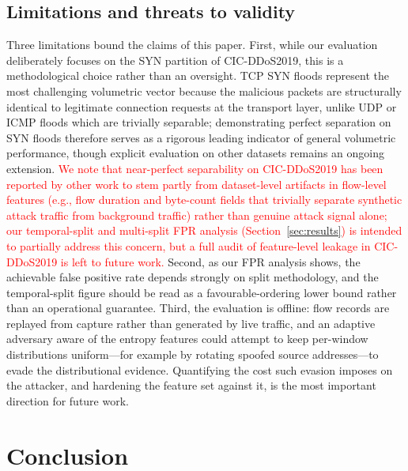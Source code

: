 \documentclass{ieeeaccess}
\begin{document}
\subsection{Limitations and threats to validity}
Three limitations bound the claims of this paper. First, while our evaluation deliberately focuses on the SYN partition of CIC-DDoS2019, this is a methodological choice rather than an oversight. TCP SYN floods represent the most challenging volumetric vector because the malicious packets are structurally identical to legitimate connection requests at the transport layer, unlike UDP or ICMP floods which are trivially separable; demonstrating perfect separation on SYN floods therefore serves as a rigorous leading indicator of general volumetric performance, though explicit evaluation on other datasets remains an ongoing extension. \textcolor{red}{We note that near-perfect separability on CIC-DDoS2019 has been reported by other work to stem partly from dataset-level artifacts in flow-level features (e.g., flow duration and byte-count fields that trivially separate synthetic attack traffic from background traffic) rather than genuine attack signal alone; our temporal-split and multi-split FPR analysis (Section~\ref{sec:results}) is intended to partially address this concern, but a full audit of feature-level leakage in CIC-DDoS2019 is left to future work.} Second, as our FPR analysis shows, the achievable false positive rate depends strongly on split methodology, and the temporal-split figure should be read as a favourable-ordering lower bound rather than an operational guarantee. Third, the evaluation is offline: flow records are replayed from capture rather than generated by live traffic, and an adaptive adversary aware of the entropy features could attempt to keep per-window distributions uniform---for example by rotating spoofed source addresses---to evade the distributional evidence. Quantifying the cost such evasion imposes on the attacker, and hardening the feature set against it, is the most important direction for future work.

\section{Conclusion}
\label{sec:conclusion}
\end{document}
